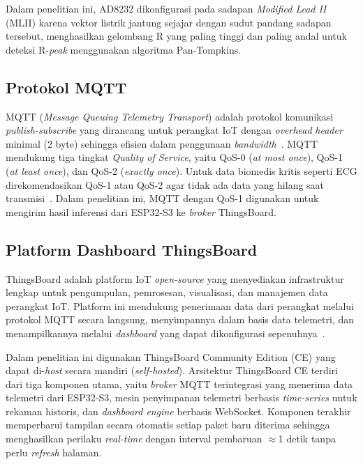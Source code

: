 Dalam penelitian ini, AD8232 dikonfigurasi pada sadapan \textit{Modified Lead II}
(MLII) karena vektor listrik jantung sejajar dengan sudut pandang sadapan
tersebut, menghasilkan gelombang R yang paling tinggi dan paling andal untuk
deteksi R-\textit{peak} menggunakan algoritma Pan-Tompkins.

\subsection{Protokol MQTT}
\label{subsec:mqtt}

MQTT (\textit{Message Queuing Telemetry Transport}) adalah protokol komunikasi \textit{publish-subscribe} yang dirancang untuk perangkat IoT dengan \textit{overhead} \textit{header} minimal (2 byte) sehingga efisien dalam penggunaan \textit{bandwidth}~\cite{oasis_mqtt5}. MQTT mendukung tiga tingkat \textit{Quality of Service}, yaitu QoS-0 (\textit{at most once}), QoS-1 (\textit{at least once}), dan QoS-2 (\textit{exactly once}). Untuk data biomedis kritis seperti ECG direkomendasikan QoS-1 atau QoS-2 agar tidak ada data yang hilang saat transmisi~\cite{lee_2013}. Dalam penelitian ini, MQTT dengan QoS-1 digunakan untuk mengirim hasil inferensi dari ESP32-S3 ke \textit{broker} ThingsBoard.

\subsection{Platform Dashboard ThingsBoard}
\label{subsec:thingsboard}

ThingsBoard adalah platform IoT \textit{open-source} yang menyediakan
infrastruktur lengkap untuk pengumpulan, pemrosesan, visualisasi, dan
manajemen data perangkat IoT. Platform ini mendukung penerimaan data dari
perangkat melalui protokol MQTT secara langsung, menyimpannya dalam basis
data telemetri, dan menampilkannya melalui \textit{dashboard} yang dapat
dikonfigurasi sepenuhnya~\cite{reoukadji_2025}.

Dalam penelitian ini digunakan ThingsBoard Community Edition (CE) yang
dapat di-\textit{host} secara mandiri (\textit{self-hosted}). Arsitektur
ThingsBoard CE terdiri dari tiga komponen utama, yaitu \textit{broker} MQTT
terintegrasi yang menerima data telemetri dari ESP32-S3, mesin penyimpanan
telemetri berbasis \textit{time-series} untuk rekaman historis, dan
\textit{dashboard engine} berbasis WebSocket. Komponen terakhir memperbarui tampilan secara
otomatis setiap paket baru diterima sehingga menghasilkan perilaku \textit{real-time}
dengan interval pembaruan $\approx$1 detik tanpa perlu \textit{refresh}
halaman.

